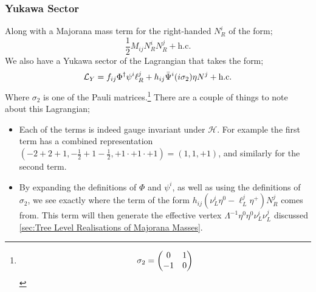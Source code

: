 \documentclass[10pt]{article}
\begin{document}
\subsubsection{Yukawa Sector}
Along with a Majorana mass term for the right-handed $N^i_R$ of the form;
\begin{equation}
  \frac{1}{2}M_{ij}N^i_R N^j_R + \text{h.c.}
\end{equation}
We also have a Yukawa sector of the Lagrangian that takes the form;
\begin{equation}
  \mathcal{L}_{Y} = f_{ij}\Phi^{\dagger}\psi^i \ell^j_R + h_{ij}\bar{\Psi}^i(i\sigma_2)\eta N^j + \text{h.c.}
\end{equation}
Where $\sigma_2$ is one of the Pauli matrices.\footnote{$$\sigma_2 = \begin{pmatrix}0&1 \\ -1&0 \end{pmatrix}$$} There are a couple of things to note about this Lagrangian;
\begin{itemize}
  \item Each of the terms is indeed gauge invariant under $\mathscr{H}$. For example the first term has a combined representation $(-2 + 2 + 1, -\tfrac{1}{2} + 1 - \tfrac{1}{2}, +1 \cdot +1 \cdot +1) = (1, 1, +1)$, and similarly for the second term.
  \item By expanding the definitions of $\Phi$ and $\psi^i$, as well as using the definitions of $\sigma_2$, we see exactly where the term of the form $h_{ij}(\nu^i_L \eta^0 - \ell^j_L \eta^+)N^j_R$ comes from. This term will then generate the effective vertex $\Lambda^{-1}\eta^0 \eta^0 \nu^i_L \nu^j_L$ discussed \ref{sec:Tree Level Realisations of Majorana Masses}.
\end{itemize}
\end{document}
